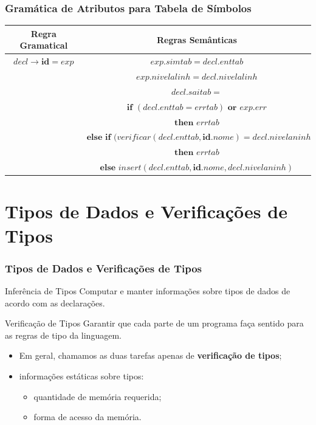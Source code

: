 \documentclass[table]{beamer}
\begin{document}
\begin{frame}
   \frametitle{Gramática de Atributos para Tabela de Símbolos}
   \small
   \begin{table}
      \begin{tabular}{cc}
      Regra Gramatical & Regras Semânticas \\
      \hline 
      $decl \to \textbf{id}=exp$ & $exp.simtab = decl.enttab$ \\
      & $exp.nivelalinh = decl.nivelalinh$ \\
      & $decl.saitab =$ \\
      & $  \textbf{if } (decl.enttab = errtab) \textbf{ or } exp.err $ \\
      & $  \textbf{then } errtab$ \\
      & $  \textbf{else if } (verificar(decl.enttab,\textbf{id}.nome) = decl.nivelaninh$ \\
      & $  \textbf{then } errtab$ \\
      & $  \textbf{else } insert(decl.enttab,\textbf{id}.nome, decl.nivelaninh)$ \\
      \end{tabular}
   \end{table}
\end{frame}

\section{Tipos de Dados e Verificações de Tipos}
\begin{frame}
   \frametitle{Tipos de Dados e Verificações de Tipos}
   \begin{block}{Inferência de Tipos}
   Computar e manter informações sobre tipos de dados de acordo com as declarações.
   \end{block}
   \begin{block}{Verificação de Tipos}
   Garantir que cada parte de um programa faça sentido para as regras de tipo da linguagem.
   \end{block}
   \begin{itemize}
      \item Em geral, chamamos as duas tarefas apenas de \textbf{verificação de tipos};
      \item informações estáticas sobre tipos:
      \begin{itemize}
         \item quantidade de memória requerida;
	 \item forma de acesso da memória.
      \end{itemize}
   \end{itemize}
\end{frame}
\end{document}
